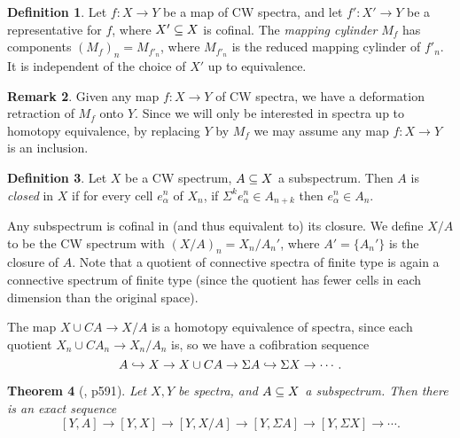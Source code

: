 \documentclass[11pt, titlepage]{article} %
\def\subq{\ensuremath\subseteq}
\def\inj{\ensuremath\hookrightarrow}
\numberwithin{equation}{subsection}
\theoremstyle{plain}
\newtheorem{theorem}{Theorem}[subsection]
\theoremstyle{definition}
\newtheorem{definition}[theorem]{Definition}
\newtheorem{remark}[theorem]{Remark}
\begin{document}
\begin{definition}
Let \(f : X \to Y\) be a map of CW spectra, and let \(f' : X' \to Y\) be a representative for \(f\), where \(X'\subq X\) is cofinal. The \textit{mapping cylinder} \(M_f\) has components \((M_f)_n=M_{f'_n}\), where \(M_{f'_n}\) is the reduced mapping cylinder of \(f'_n\). It is independent of the choice of \(X'\) up to equivalence.
\end{definition}

\begin{remark}\label{2504231152}
Given any map \(f : X \to Y\) of CW spectra, we have a deformation retraction of \(M_f\) onto \(Y\). Since we will only be interested in spectra up to homotopy equivalence, by replacing \(Y\) by \(M_f\) we may assume any map \(f : X \to Y\) is an inclusion. 
\end{remark}

\begin{definition}
Let \(X\) be a CW spectrum, \(A\subq X\) a subspectrum. Then \(A\) is \textit{closed} in \(X\) if for every cell \(e_\alpha^n\) of \(X_n\), if \(\Sigma^k e_\alpha^n \in A_{n+k}\) then \(e_\alpha^n \in A_n\). 
\end{definition}

Any subspectrum is cofinal in (and thus equivalent to) its closure. We define \(X/A\) to be the CW spectrum with \((X/A)_n=X_n/A_n'\), where \(A'=\{A_n'\}\) is the closure of \(A\). Note that a quotient of connective spectra of finite type is again a connective spectrum of finite type (since the quotient has fewer cells in each dimension than the original space).

The map \(X\cup CA\to X/A\) is a homotopy equivalence of spectra, since each quotient \(X_n \cup CA_n \to X_n/A_n\) is, so we have a cofibration sequence
\[A \inj X \to X\cup CA \to \Sigma A \inj \Sigma X \to \cdots.\]

\begin{theorem}[{\autocite{hatcher5}, p591}]\label{2504151709}
Let \(X,Y\) be spectra, and \(A\subq X\) a subspectrum. Then there is an exact sequence
\[[Y,A]\to[Y,X]\to[Y,X/A]\to[Y,\Sigma A]\to[Y,\Sigma X]\to\cdots.\]
\end{theorem}
\end{document}
